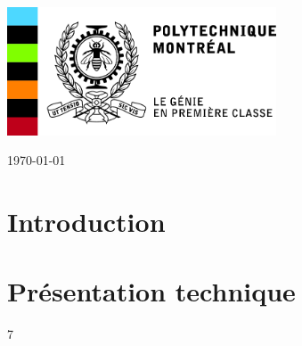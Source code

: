 \begin{titlepage}



\includegraphics[height=3.8cm]{poly.jpg} %
 


{\large \today}\\[2cm] %


\vfill %

\end{titlepage}

\section{Introduction}

\section{Présentation technique}7
